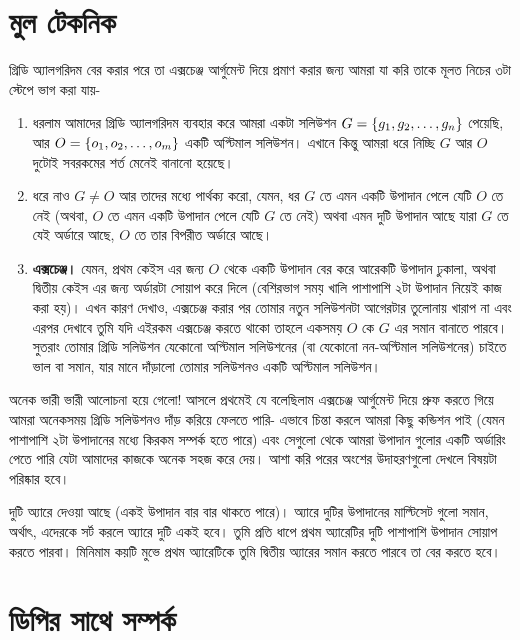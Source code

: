 \section{মুল টেকনিক}

গ্রিডি অ্যালগরিদম বের করার পরে তা এক্সচেঞ্জ আর্গুমেন্ট দিয়ে প্রমাণ করার জন্য আমরা যা করি তাকে মূলত নিচের ৩টা স্টেপে ভাগ করা যায়-
\begin{enumerate}
	\item ধরলাম আমাদের গ্রিডি অ্যালগরিদম ব্যবহার করে আমরা একটা সলিউশন $G = \left \{ g_1, g_2, \ldots, g_n \right \}$ পেয়েছি, আর $O = \left \{ o_1, o_2, \ldots, o_m \right \}$ একটি অপ্টিমাল সলিউশন।  এখানে কিন্তু আমরা ধরে নিচ্ছি $G$ আর $O$ দুটোই সবরকমের শর্ত মেনেই বানানো হয়েছে।
	\item ধরে নাও $G \not= O$ আর  তাদের মধ্যে পার্থক্য করো, যেমন, ধর $G$ তে এমন একটি উপাদান পেলে যেটি $O$ তে নেই (অথবা, $O$ তে এমন একটি উপাদান পেলে যেটি $G$ তে নেই) অথবা এমন দুটি উপাদান আছে যারা $G$ তে যেই অর্ডারে আছে, $O$ তে তার বিপরীত অর্ডারে আছে।
	\item \textbf{এক্সচেঞ্জ।} যেমন, প্রথম কেইস এর জন্য $O$ থেকে একটি উপাদান বের করে আরেকটি উপাদান ঢুকালা, অথবা দ্বিতীয় কেইস এর জন্য অর্ডারটা সোয়াপ করে দিলে (বেশিরভাগ সময় খালি পাশাপাশি ২টা উপাদান নিয়েই কাজ করা হয়)। এখন কারণ দেখাও, এক্সচেঞ্জ করার পর তোমার নতুন সলিউশনটা আগেরটার তুলোনায় খারাপ না এবং এরপর দেখাবে তুমি যদি এইরকম এক্সচেঞ্জ করতে থাকো তাহলে একসময় $O$ কে $G$ এর সমান বানাতে পারবে। সুতরাং তোমার গ্রিডি সলিউশন যেকোনো অপ্টিমাল সলিউশনের (বা যেকোনো নন-অপ্টিমাল সলিউশনের) চাইতে ভাল বা সমান, যার মানে দাঁড়ালো তোমার সলিউশনও একটি অপ্টিমাল সলিউশন।
\end{enumerate}

অনেক ভারী ভারী আলোচনা হয়ে গেলো! আসলে প্রথমেই যে বলেছিলাম এক্সচেঞ্জ আর্গুমেন্ট দিয়ে প্রুফ করতে গিয়ে আমরা অনেকসময় গ্রিডি সলিউশনও দাঁড় করিয়ে ফেলতে পারি- এভাবে চিন্তা করলে আমরা কিছু কন্ডিশন পাই (যেমন পাশাপাশি ২টা উপাদানের মধ্যে কিরকম সম্পর্ক হতে পারে) এবং সেগুলো থেকে আমরা উপাদান গুলোর একটি অর্ডারিং পেতে পারি যেটা আমাদের কাজকে অনেক সহজ করে দেয়। আশা করি পরের অংশের উদাহরণগুলো দেখলে বিষয়টা পরিষ্কার হবে।

\begin{exercise}
দুটি অ্যারে দেওয়া আছে (একই উপাদান বার বার থাকতে পারে)। অ্যারে দুটির উপাদানের মাল্টিসেট গুলো সমান, অর্থাৎ, এদেরকে সর্ট করলে অ্যারে দুটি একই হবে। তুমি প্রতি ধাপে প্রথম অ্যারেটির দুটি পাশাপাশি উপাদান সোয়াপ করতে পারবা। মিনিমাম কয়টি মুভে প্রথম অ্যারেটিকে তুমি দ্বিতীয় অ্যারের সমান করতে পারবে তা বের করতে হবে।
\end{exercise}

\section{ডিপির সাথে সম্পর্ক}

